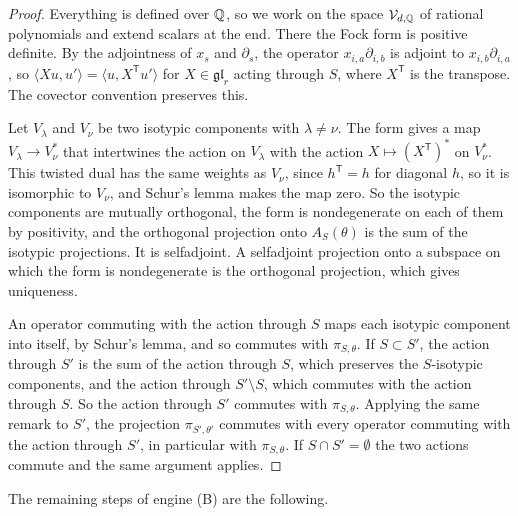 \begin{proof}
Everything is defined over $\mathbb Q$, so we work on the space $\mathcal V_{d,\mathbb Q}$ of rational polynomials and extend scalars at the end. There the Fock form is positive definite. By the adjointness of $x_s$ and $\partial_s$, the operator $x_{i,a}\partial_{i,b}$ is adjoint to $x_{i,b}\partial_{i,a}$, so $\langle Xu,u'\rangle=\langle u,X^{\mathsf T}u'\rangle$ for $X\in\mathfrak{gl}_r$ acting through $S$, where $X^{\mathsf T}$ is the transpose. The covector convention preserves this.

Let $V_\lambda$ and $V_\nu$ be two isotypic components with $\lambda\ne\nu$. The form gives a map $V_\lambda\to V_\nu^*$ that intertwines the action on $V_\lambda$ with the action $X\mapsto(X^{\mathsf T})^*$ on $V_\nu^*$. This twisted dual has the same weights as $V_\nu$, since $h^{\mathsf T}=h$ for diagonal $h$, so it is isomorphic to $V_\nu$, and Schur's lemma makes the map zero. So the isotypic components are mutually orthogonal, the form is nondegenerate on each of them by positivity, and the orthogonal projection onto $A_S(\theta)$ is the sum of the isotypic projections. It is selfadjoint. A selfadjoint projection onto a subspace on which the form is nondegenerate is the orthogonal projection, which gives uniqueness.

An operator commuting with the action through $S$ maps each isotypic component into itself, by Schur's lemma, and so commutes with $\pi_{S,\theta}$. If $S\subset S'$, the action through $S'$ is the sum of the action through $S$, which preserves the $S$-isotypic components, and the action through $S'\setminus S$, which commutes with the action through $S$. So the action through $S'$ commutes with $\pi_{S,\theta}$. Applying the same remark to $S'$, the projection $\pi_{S',\theta'}$ commutes with every operator commuting with the action through $S'$, in particular with $\pi_{S,\theta}$. If $S\cap S'=\emptyset$ the two actions commute and the same argument applies.
\end{proof}



The remaining steps of engine (B) are the following.

